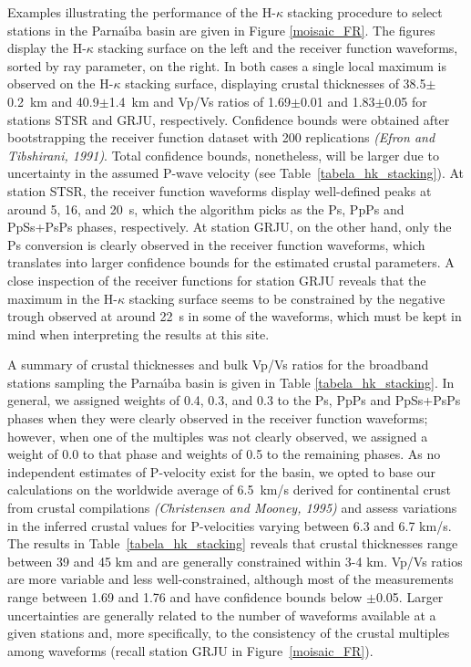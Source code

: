 \documentclass[manuscript,11pt]{geophysics}
\begin{document}
Examples illustrating the performance of the H-$\kappa$ stacking procedure to select stations in the Parna\'{\i}ba basin are given in Figure \ref{moisaic_FR}. The figures display the H-$\kappa$ stacking surface on the left and the receiver function waveforms, sorted by ray parameter, on the right. In both cases a single local maximum is observed on the H-$\kappa$ stacking surface, displaying crustal thicknesses of 38.5$\pm$0.2~km and 40.9$\pm$1.4~km and Vp/Vs ratios of 1.69$\pm$0.01 and 1.83$\pm$0.05 for stations STSR and GRJU, respectively. Confidence bounds were obtained after bootstrapping the receiver function dataset with 200 replications \textit{(Efron and Tibshirani, 1991)}. Total confidence bounds, nonetheless, will be larger due to uncertainty in the assumed P-wave velocity (see Table~\ref{tabela_hk_stacking}). At station STSR, the receiver function waveforms display well-defined peaks at around 5, 16, and 20~s, which the algorithm picks as the Ps, PpPs and PpSs+PsPs phases, respectively. At station GRJU, on the other hand, only the Ps conversion is clearly observed in the receiver function waveforms, which translates into larger confidence bounds for the estimated crustal parameters. A close inspection of the receiver functions for station GRJU reveals that the maximum in the H-$\kappa$ stacking surface seems to be constrained by the negative trough observed at around 22~s in some of the waveforms, which must be kept in mind when interpreting the results at this site.

A summary of crustal thicknesses and bulk Vp/Vs ratios for the broadband stations sampling the Parna\'{\i}ba basin is given in Table \ref{tabela_hk_stacking}. In general, we assigned weights of 0.4, 0.3, and 0.3 to the Ps, PpPs and PpSs+PsPs phases when they were clearly observed in the receiver function waveforms; however, when one of the multiples was not clearly observed, we assigned a weight of 0.0 to that phase and weights of 0.5 to the remaining phases. As no independent estimates of P-velocity exist for the basin, we opted to base our calculations on the worldwide average of 6.5~km/s derived for continental crust from crustal compilations \textit{(Christensen and Mooney, 1995)} and assess variations in the inferred crustal values for P-velocities varying between 6.3 and 6.7 km/s. The results in Table~\ref{tabela_hk_stacking} reveals that crustal thicknesses range between 39 and 45 km and are generally constrained within 3-4 km. Vp/Vs ratios are more variable and less well-constrained, although most of the measurements range between 1.69 and 1.76 and have confidence bounds below $\pm $0.05. Larger uncertainties are generally related to the number of waveforms available at a given stations and, more specifically, to the consistency of the crustal multiples among waveforms (recall station GRJU in Figure~\ref{moisaic_FR}).
\end{document}

